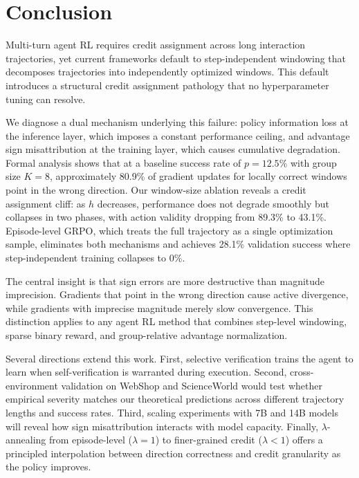 \section{Conclusion}
\label{sec:conclusion}

Multi-turn agent RL requires credit assignment across long interaction trajectories, yet current frameworks default to step-independent windowing that decomposes trajectories into independently optimized windows. This default introduces a structural credit assignment pathology that no hyperparameter tuning can resolve.

We diagnose a dual mechanism underlying this failure: policy information loss at the inference layer, which imposes a constant performance ceiling, and advantage sign misattribution at the training layer, which causes cumulative degradation. Formal analysis shows that at a baseline success rate of $p = 12.5\%$ with group size $K = 8$, approximately 80.9\% of gradient updates for locally correct windows point in the wrong direction. Our window-size ablation reveals a credit assignment cliff: as $h$ decreases, performance does not degrade smoothly but collapses in two phases, with action validity dropping from 89.3\% to 43.1\%. Episode-level GRPO, which treats the full trajectory as a single optimization sample, eliminates both mechanisms and achieves 28.1\% validation success where step-independent training collapses to 0\%.

The central insight is that sign errors are more destructive than magnitude imprecision. Gradients that point in the wrong direction cause active divergence, while gradients with imprecise magnitude merely slow convergence. This distinction applies to any agent RL method that combines step-level windowing, sparse binary reward, and group-relative advantage normalization.

Several directions extend this work. First, selective verification trains the agent to learn when self-verification is warranted during execution. Second, cross-environment validation on WebShop and ScienceWorld would test whether empirical severity matches our theoretical predictions across different trajectory lengths and success rates. Third, scaling experiments with 7B and 14B models will reveal how sign misattribution interacts with model capacity. Finally, $\lambda$-annealing from episode-level ($\lambda = 1$) to finer-grained credit ($\lambda < 1$) offers a principled interpolation between direction correctness and credit granularity as the policy improves.
